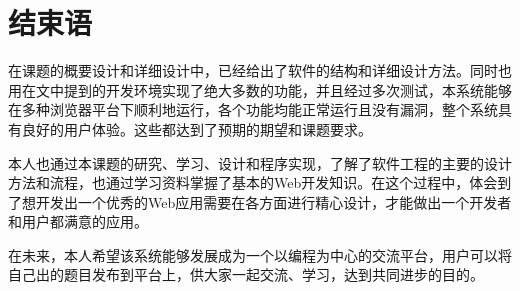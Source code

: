 
\chapter{结束语}
在课题的概要设计和详细设计中，已经给出了软件的结构和详细设计方法。同时也用在文中提到的开发环境实现了绝大多数的功能，并且经过多次测试，本系统能够在多种浏览器平台下顺利地运行，各个功能均能正常运行且没有漏洞，整个系统具有良好的用户体验。这些都达到了预期的期望和课题要求。

本人也通过本课题的研究、学习、设计和程序实现，了解了软件工程的主要的设计方法和流程，也通过学习资料掌握了基本的Web开发知识。在这个过程中，体会到了想开发出一个优秀的Web应用需要在各方面进行精心设计，才能做出一个开发者和用户都满意的应用。 

在未来，本人希望该系统能够发展成为一个以编程为中心的交流平台，用户可以将自己出的题目发布到平台上，供大家一起交流、学习，达到共同进步的目的。